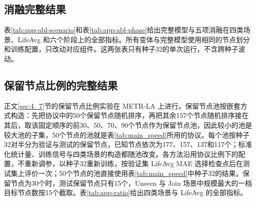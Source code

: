 \begin{table}[p]
\centering
\caption{\textbf{PEMS-BAY 的分阶段结果。}记号与表\ref{tab:app-phase-metrla}相同。}
\label{tab:app-phase-pemsbay}
\small
\resizebox{\linewidth}{!}{}
\end{table}

\begin{table}[p]
\centering
\caption{\textbf{PEMS04 的分阶段结果。}记号与表\ref{tab:app-phase-metrla}相同。}
\label{tab:app-phase-pems04}
\small
\resizebox{\linewidth}{!}{}
\end{table}

\begin{table}[p]
\centering
\caption{\textbf{PEMS08 的分阶段结果。}记号与表\ref{tab:app-phase-metrla}相同。}
\label{tab:app-phase-pems08}
\small
\resizebox{\linewidth}{!}{}
\end{table}

\subsection{消融完整结果}\label{sec:A_3}

表\ref{tab:app-abl-scenario}和表\ref{tab:app-abl-phase}给出完整模型与五项消融在四类场景、LifeAvg 和六个阶段上的全部指标。所有变体与完整模型使用相同的节点划分和训练配置，只改动对应组件。这两张表只有种子32的单次运行，不含跨种子波动。

\begin{table}[p]
\centering
\caption{\textbf{消融在四类场景与 LifeAvg 上的结果。}测试集，仅种子32，单次运行。}
\label{tab:app-abl-scenario}
\small
\resizebox{\linewidth}{!}{}
\end{table}

\begin{table}[p]
\centering
\caption{\textbf{消融在 Join 与 Fault 六个阶段上的结果。}测试集，仅种子32，单次运行。}
\label{tab:app-abl-phase}
\small
\resizebox{\linewidth}{!}{}
\end{table}

\subsection{保留节点比例的完整结果}\label{sec:A_4}

正文\ref{sec:4_7}节的保留节点比例实验在 METR-LA 上进行。保留节点池按嵌套方式构造：先把协议中的50个保留节点随机排序，再把其余157个节点随机排序接在其后，取该固定顺序的前30、50、70、90个节点作为保留节点池，因此较小的池是较大池的子集，50个节点的池就是表\ref{tab:main_speed}所用的协议。每个池按种子32对半分为验证与测试的保留节点，已知节点依次为177、157、137和117个；标准化统计量、训练信号与四类场景的构造都随池改变。各方法沿用协议比例下的配置，不重新调参，以种子32重新训练，按验证集 LifeAvg MAE 选择检查点后在测试集上评价一次；50个节点的池直接使用表\ref{tab:main_speed}中种子32的结果。保留节点为30个时，测试保留节点只有15个，Unseen 与 Join 场景中规模最大的一档目标节点数按15个截取。表\ref{tab:app-ratio}给出四类场景与 LifeAvg 的全部指标。

